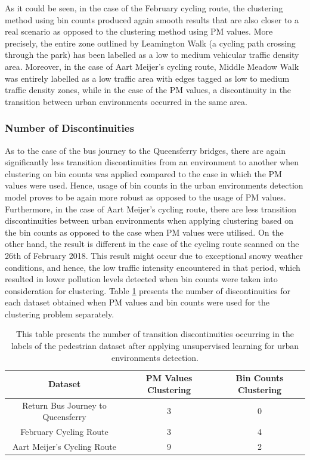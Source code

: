 \documentclass[bsc,frontabs,twoside,singlespacing, parskip,deptreport]{infthesis}     %
\begin{document}
As it could be seen, in the case of the February cycling route, the clustering method using bin counts produced again smooth results that are also closer to a real scenario as opposed to the clustering method using PM values. More precisely, the entire zone outlined by Leamington Walk (a cycling path crossing through the park) has been labelled as a low to medium vehicular traffic density area. Moreover, in the case of Aart Meijer's cycling route, Middle Meadow Walk was entirely labelled as a low traffic area with edges tagged as low to medium traffic density zones, while in the case of the PM values, a discontinuity in the transition between urban environments occurred in the same area.


\subsubsection*{Number of Discontinuities}

As to the case of the bus journey to the Queensferry bridges, there are again significantly less transition discontinuities from an environment to another when clustering on bin counts was applied compared to the case in which the PM values were used. Hence, usage of bin counts in the urban environments detection model proves to be again more robust as opposed to the usage of PM values. Furthermore, in the case of Aart Meijer's cycling route, there are less transition discontinuities between urban environments when applying clustering based on the bin counts as opposed to the case when PM values were utilised. On the other hand, the result is different in the case of the cycling route scanned on the 26th of February 2018. This result might occur due to exceptional snowy weather conditions, and hence, the low traffic intensity encountered in that period, which resulted in lower pollution levels detected when bin counts were taken into consideration for clustering. Table \ref{table:discontinuities-bike-bus} presents the number of discontinuities for each dataset obtained when PM values and bin counts were used for the clustering problem separately.


\begin{table}[h!]
\centering
 \begin{tabular}{||c | c | c ||} 
 \hline
 Dataset & PM Values Clustering & Bin Counts Clustering \\ [0.5ex] 
 \hline\hline
 Return Bus Journey to Queensferry & 3 & 0 \\ 
 \hline
 February Cycling Route & 3 & 4 \\
 \hline
 Aart Meijer's Cycling Route & 9 & 2 \\
 \hline
\end{tabular}
\caption{This table presents the number of transition discontinuities occurring in the labels of the pedestrian dataset after applying unsupervised learning for urban environments detection.}
\label{table:discontinuities-bike-bus}
\end{table}
\end{document}
